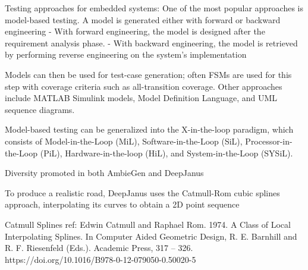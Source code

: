 Testing approaches for embedded systems:
One of the most popular approaches is model-based testing. A model is generated either with forward or backward engineering
	- With forward engineering, the model is designed after the requirement analysis phase.
	- With backward engineering, the model is retrieved by performing reverse engineering on the system's implementation

Models can then be used for test-case generation; often FSMs are used for this step with coverage criteria such as all-transition coverage. Other approaches include MATLAB Simulink models, Model Definition Language, and UML sequence diagrams.

Model-based testing can be generalized into the X-in-the-loop paradigm, which consists of Model-in-the-Loop (MiL), Software-in-the-Loop (SiL), Processor-in-the-Loop (PiL), Hardware-in-the-loop (HiL), and System-in-the-Loop (SYSiL).




Diversity promoted in both AmbieGen and DeepJanus

To produce a realistic road, DeepJanus uses the Catmull-Rom cubic splines approach, interpolating its curves to obtain a 2D point sequence

Catmull Splines ref: Edwin Catmull and Raphael Rom. 1974. A Class of Local Interpolating Splines.
In Computer Aided Geometric Design, R. E. Barnhill and R. F. Riesenfeld (Eds.).
Academic Press, 317 – 326. https://doi.org/10.1016/B978-0-12-079050-0.50020-5